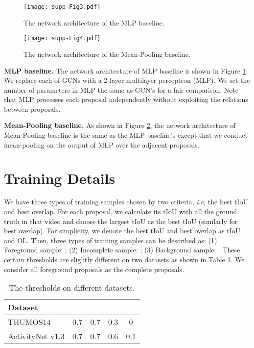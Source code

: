 \documentclass[10pt,twocolumn,letterpaper]{article}
\def\ie{\emph{i.e}\onedot} \def\Ie{\emph{I.e}\onedot}
\begin{document}
\begin{figure}[!bt]
	\centering
	\texttt{[image: supp-Fig3.pdf]}
	\caption{The network architecture of the MLP baseline.}
	\label{Fig:mlp_baseline}
\end{figure}

\begin{figure}[!bt]
	\centering
	\texttt{[image: supp-Fig4.pdf]}
	\caption{The network architecture of the Mean-Pooling baseline.}
	\label{Fig:mp_baseline}
\end{figure}



\noindent \textbf{MLP baseline.}
The network architecture of MLP baseline is shown in Figure \ref{Fig:mlp_baseline}.
We replace each of GCNs with a 2-layer multilayer perceptron (MLP). We set the number of parameters in MLP the same as GCN's for a fair comparison. Note that MLP processes each proposal independently without exploiting the relations between proposals. 



\noindent \textbf{Mean-Pooling baseline.}
As shown in Figure \ref{Fig:mp_baseline}, the network architecture of Mean-Pooling baseline is the same as the MLP baseline's except that we conduct mean-pooling on the output of MLP over the adjacent proposals.



\section{Training Details}

We have three types of training samples chosen by two criteria, \ie, the best tIoU and best overlap. For each proposal, we calculate its tIoU with all the ground truth in that video and choose the largest tIoU as the best tIoU (similarly for best overlap). For simplicity, we denote the best tIoU and best overlap as tIoU and OL. Then, three types of training samples can be described as: (1) Foreground sample: ; (2) Incomplete sample: ; (3) Background sample: . These certain thresholds are slightly different on two datasets as shown in Table \ref{Tab:thr}. We consider all foreground proposals as the complete proposals.

\begin{table}[h]
	\centering
	\caption{The thresholds on different datasets.}
\begin{tabular}{l|cccc}
		\hline
		Dataset                &      &   &   &         \\ \hline
		THUMOS14    & 0.7   & 0.7       & 0.3 & 0 \\
		ActivityNet v1.3   & 0.7   & 0.7      & 0.6 & 0.1 \\ \hline
	\end{tabular}
	\vspace{-0.3cm}
	\label{Tab:thr}
\end{table}
\end{document}
